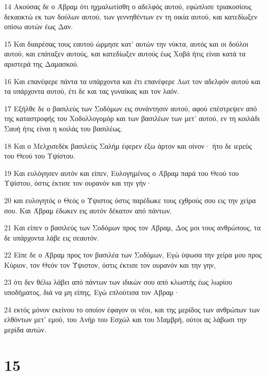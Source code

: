 \par 14 Ακούσας δε ο Άβραμ ότι ηχμαλωτίσθη ο αδελφός αυτού, εφώπλισε τριακοσίους δεκαοκτώ εκ των δούλων αυτού, των γεννηθέντων εν τη οικία αυτού, και κατεδίωξεν οπίσω αυτών έως Δαν.
\par 15 Και διαιρέσας τους εαυτού ώρμησε κατ' αυτών την νύκτα, αυτός και οι δούλοι αυτού, και επάταξεν αυτούς, και κατεδίωξεν αυτούς έως Χοβά ήτις είναι κατά τα αριστερά της Δαμασκού.
\par 16 Και επανέφερε πάντα τα υπάρχοντα και έτι επανέφερε Λωτ τον αδελφόν αυτού και τα υπάρχοντα αυτού, έτι δε και τας γυναίκας και τον λαόν.
\par 17 Εξήλθε δε ο βασιλεύς των Σοδόμων εις συνάντησιν αυτού, αφού επέστρεψεν από της καταστροφής του Χοδολλογομόρ και των βασιλέων των μετ' αυτού, εν τη κοιλάδι Σαυή ήτις είναι η κοιλάς του βασιλέως.
\par 18 Και ο Μελχισεδέκ βασιλεύς Σαλήμ έφερεν έξω άρτον και οίνον· ήτο δε ιερεύς του Θεού του Υψίστου.
\par 19 Και ευλόγησεν αυτόν και είπεν, Ευλογημένος ο Άβραμ παρά του Θεού του Υψίστου, όστις έκτισε τον ουρανόν και την γήν·
\par 20 και ευλογητός ο Θεός ο Ύψιστος όστις παρέδωκε τους εχθρούς σου εις την χείρα σου. Και Άβραμ έδωκεν εις αυτόν δέκατον από πάντων.
\par 21 Και είπεν ο βασιλεύς των Σοδόμων προς τον Άβραμ, Δος μοι τους ανθρώπους, τα δε υπάρχοντα λάβε εις σεαυτόν.
\par 22 Είπε δε ο Άβραμ προς τον βασιλέα των Σοδόμων, Εγώ ύψωσα την χείρα μου προς Κύριον, τον Θεόν τον Ύψιστον, όστις έκτισε τον ουρανόν και την γην,
\par 23 ότι δεν θέλω λάβει από πάντων των ιδικών σου από κλωστής έως λωρίου υποδήματος, διά να μη είπης, Εγώ επλούτισα τον Αβραμ·
\par 24 εκτός μόνον εκείνου το οποίον έφαγον οι νέοι, και της μερίδος των ανθρώπων των ελθόντων μετ' εμού, του Ανήρ του Εσχώλ και του Μαμβρή, ούτοι ας λάβωσι την μερίδα αυτών.

\chapter{15}

